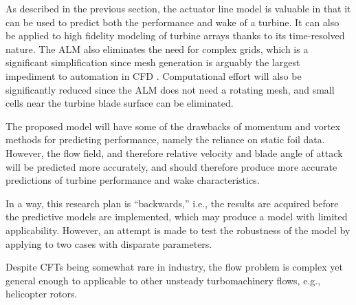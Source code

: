 As described in the previous section, the actuator line model is valuable in
that it can be used to predict both the performance and wake of a turbine. It
can also be applied to high fidelity modeling of turbine arrays thanks to its
time-resolved nature. The ALM also eliminates the need for complex grids, which
is a significant simplification since mesh generation is arguably the largest
impediment to automation in CFD \cite{Slotnick2014}. Computational effort will
also be significantly reduced since the ALM does not need a rotating mesh, and
small cells near the turbine blade surface can be eliminated.

The proposed model will have some of the drawbacks of momentum and vortex
methods for predicting performance, namely the reliance on static foil data.
However, the flow field, and therefore relative velocity and blade angle of
attack will be predicted more accurately, and should therefore produce more
accurate predictions of turbine performance and wake characteristics.

In a way, this research plan is ``backwards,'' i.e., the results are acquired
before the predictive models are implemented, which may produce a model with
limited applicability. However, an attempt is made to test the robustness of the
model by applying to two cases with disparate parameters.

Despite CFTs being somewhat rare in industry, the flow problem is complex yet
general enough to applicable to other unsteady turbomachinery flows, e.g.,
helicopter rotors.
